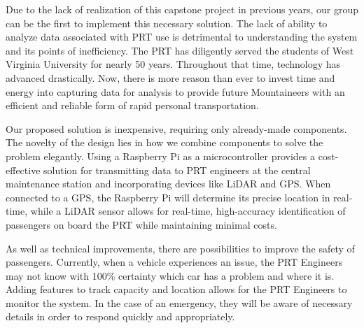 Due to the lack of realization of this capstone project in previous years, our group can be the first to implement this necessary solution. The lack of ability to analyze data associated with PRT use is detrimental to understanding the system and its points of inefficiency. The PRT has diligently served the students of West Virginia University for nearly 50 years. Throughout that time, technology has advanced drastically. Now, there is more reason than ever to invest time and energy into capturing data for analysis to provide future Mountaineers with an efficient and reliable form of rapid personal transportation.

Our proposed solution is inexpensive, requiring only already-made components. The novelty of the design lies in how we combine components to solve the problem elegantly. Using a Raspberry Pi as a microcontroller provides a cost-effective solution for transmitting data to PRT engineers at the central maintenance station and incorporating devices like LiDAR and GPS. When connected to a GPS, the Raspberry Pi will determine its precise location in real-time, while a LiDAR sensor allows for real-time, high-accuracy identification of passengers on board the PRT while maintaining minimal costs.

As well as technical improvements, there are possibilities to improve the safety of passengers. Currently, when a vehicle experiences an issue, the PRT Engineers may not know with 100\% certainty which car has a problem and where it is. Adding features to track capacity and location allows for the PRT Engineers to monitor the system. In the case of an emergency, they will be aware of necessary details in order to respond quickly and appropriately.
